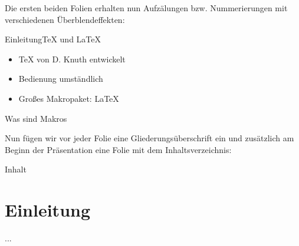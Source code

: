 \begin{minipage}\textwidth
{}
Die ersten beiden Folien erhalten nun Aufzälungen bzw. Nummerierungen mit verschiedenen Überblendeffekten:
\begin{lcode}
\begin{frame}{Einleitung}{\TeX{} und \LaTeX}
	\begin{itemize}
		\item<+-> \TeX{} von D. Knuth entwickelt
		\item<+> Bedienung umständlich
		\item<3> Großes Makropaket: \LaTeX
	\end{itemize}
\end{frame}

\begin{frame}{Was sind Makros}
	\begin{enumerate}
	\end{enumerate}
\end{frame}
\end{lcode}

Nun fügen wir vor jeder Folie eine Gliederungsüberschrift ein und zusätzlich am Beginn der Präsentation eine Folie mit dem Inhaltsverzeichnis:
\begin{lcode}
\begin{frame}{Inhalt}
\tableofcontents
\end{frame}

\section{Einleitung}
...
\end{lcode}
\end{minipage}
